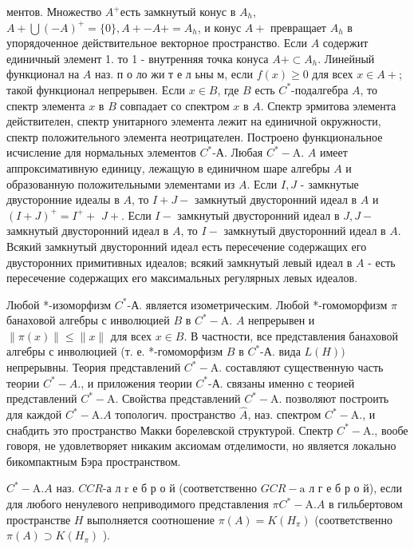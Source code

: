 \documentclass[10pt]{article}
\begin{document}
ментов. Множество $A^{+}$есть замкнутый конус в $A_{h}$, $A+\bigcup(-A)^{+}=\{0\}, A+-A+=A_{h}$, и конус $A+$ превращает $A_{h}$ в упорядоченное действительное векторное пространство. Если $A$ содержит единичный элемент 1. то 1 - внутренняя точка конуса $A+\subset A_{h}$. Линейный функционал на $A$ наз. п о ло жи т е л ьны м, если $f(x) \geqslant 0$ для всех $x \in A+$; такой функционал непрерывен. Если $x \in B$, где $B$ есть $C^{*}$-подалгебра $A$, то спектр элемента $x$ в $B$ совпадает со спектром $x$ в $A$. Спектр эрмитова элемента действителен, спектр унитарного элемента лежит на единичной окружности, спектр положительного элемента неотрицателен. Построено функциональное исчисление для нормальных элементов $C^{*}$-А. Любая $C^{*}-\mathrm{A}$. $A$ имеет аппроксимативную единицу, лежащую в единичном шаре алгебры $A$ и образованную положительными элементами из $A$. Если $I, J$ - замкнутые двусторонние идеалы в $A$, то $I+J-$ замкнутый двусторонний идеал в $A$ и $(I+J)^{+}=I^{+}+$ $J+$. Если $I-$ замкнутый двусторонний идеал в $J, J-$ замкнутый двусторонний идеал в $A$, то $I-$ замкнутый двусторонний идеал в $A$. Всякий замкнутый двусторонний идеал есть пересечение содержащих его двусторонних примитивных идеалов; всякий замкнутый левый идеал в $A$ - есть пересечение содержащих его максимальных регулярных левых идеалов.



Любой *-изоморфизм $C^{*}$-А. является изометрическим. Любой *-гомоморфизм $\pi$ банаховой алгебры с инволюцией $B$ в $C^{*}-\mathrm{A}$. $A$ непрерывен и $\|\pi(x)\| \leqslant\|x\|$ для всех $x \in B$. В частности, все представления банаховой алгебры с инволюцией (т. е. *-гомоморфизм $B$ в $C^{*}$-А. вида $L(H))$ непрерывны. Теория представлений $C^{*}-\mathrm{A}$. составляют существенную часть теории $C^{*}-A .$, и приложения теории $C^{*}$-А. связаны именно с теорией представлений $C^{*}-\mathrm{A}$. Свойства представлений $C^{*}-\mathrm{A}$. позволяют построить для каждой $C^{*}-\mathrm{A} . A$ топологич. пространство $\hat{A}$, наз. спектром $C^{*}-\mathrm{A} .$, и снабдить это пространство Макки борелевской структурой. Спектр $C^{*}-\mathrm{A}$., вообе говоря, не удовлетворяет никаким аксиомам отделимости, но является локально бикомпактным Бэра пространством.



$C^{*}-\mathrm{A} . A$ наз. $C C R$-а л $\mathrm{r}$ е б р о й (соответственно $G C R-\mathrm{a}$ л г е б р о й), если для любого ненулевого неприводимого представления $\pi C^{*}-\mathrm{A} . A$ в гильбертовом пространстве $H$ выполняется соотношение $\pi(A)=K\left(H_{\pi}\right)$ (соответственно $\pi(A) \supset K\left(H_{\pi}\right)$ ).
\end{document}
